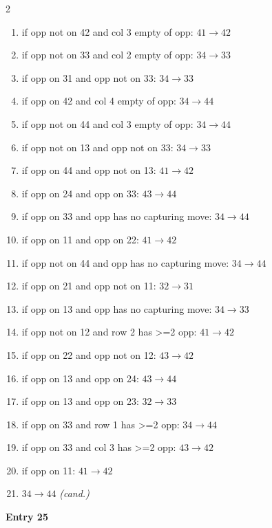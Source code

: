 \begin{multicols}{2}
\begin{tikzpicture}[scale=0.24]
\end{tikzpicture}
\nopagebreak\begin{enumerate}[topsep=1pt,itemsep=0pt,parsep=0pt,leftmargin=2.2em,label=\arabic*.]
\item if opp not on 42 and col 3 empty of opp: $41\!\to\!42$
\item if opp not on 33 and col 2 empty of opp: $34\!\to\!33$
\item if opp on 31 and opp not on 33: $34\!\to\!33$
\item if opp on 42 and col 4 empty of opp: $34\!\to\!44$
\item if opp not on 44 and col 3 empty of opp: $34\!\to\!44$
\item if opp not on 13 and opp not on 33: $34\!\to\!33$
\item if opp on 44 and opp not on 13: $41\!\to\!42$
\item if opp on 24 and opp on 33: $43\!\to\!44$
\item if opp on 33 and opp has no capturing move: $34\!\to\!44$
\item if opp on 11 and opp on 22: $41\!\to\!42$
\item if opp not on 44 and opp has no capturing move: $34\!\to\!44$
\item if opp on 21 and opp not on 11: $32\!\to\!31$
\item if opp on 13 and opp has no capturing move: $34\!\to\!33$
\item if opp not on 12 and row 2 has >=2 opp: $41\!\to\!42$
\item if opp on 22 and opp not on 12: $43\!\to\!42$
\item if opp on 13 and opp on 24: $43\!\to\!44$
\item if opp on 13 and opp on 23: $32\!\to\!33$
\item if opp on 33 and row 1 has >=2 opp: $34\!\to\!44$
\item if opp on 33 and col 3 has >=2 opp: $43\!\to\!42$
\item if opp on 11: $41\!\to\!42$
\item $34\!\to\!44$ \hfill\textit{(cand.)}
\end{enumerate}\smallskip
\noindent\textbf{Entry 25} \; 
\end{multicols}
